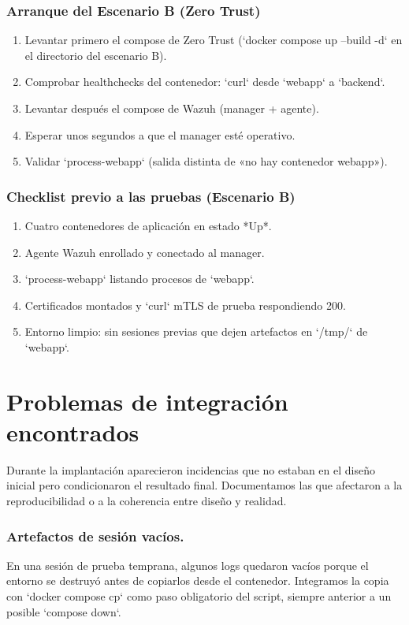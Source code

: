 \documentclass[11pt,spanish,listoffigures,listoftables]{tfgetsinf}
\begin{document}
    
    \subsubsection{Arranque del Escenario B (Zero Trust)}
    \begin{enumerate}
        \item Levantar primero el compose de Zero Trust (`docker compose up --build -d` en el directorio del escenario B).
        \item Comprobar healthchecks del contenedor: `curl` desde `webapp` a `backend`.
        \item Levantar después el compose de Wazuh (manager + agente).
        \item Esperar unos segundos a que el manager esté operativo.
        \item Validar `process-webapp` (salida distinta de «no hay contenedor webapp»).
    \end{enumerate}
    
    
    \subsubsection{Checklist previo a las pruebas (Escenario B)}
    \begin{enumerate}
        \item Cuatro contenedores de aplicación en estado *Up*.
    \item Agente Wazuh enrollado y conectado al manager.
    \item `process-webapp` listando procesos de `webapp`.
    \item Certificados montados y `curl` mTLS de prueba respondiendo 200.
    \item Entorno limpio: sin sesiones previas que dejen artefactos en `/tmp/` de `webapp`.
    \end{enumerate}
    
    \section{Problemas de integración encontrados}
    Durante la implantación aparecieron incidencias que no estaban en el diseño inicial pero condicionaron el resultado final. Documentamos las que afectaron a la reproducibilidad o a la coherencia entre diseño y realidad.
    
    \subsubsection{Artefactos de sesión vacíos.} 
    En una sesión de prueba temprana, algunos logs quedaron vacíos porque el entorno se destruyó antes de copiarlos desde el contenedor. Integramos la copia con `docker compose cp` como paso obligatorio del script, siempre anterior a un posible `compose down`.
    
\end{document}
